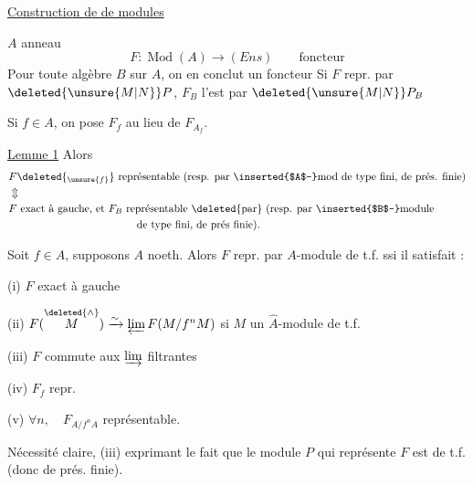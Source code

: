 \margin{$\big/\!\big/$}\uline{Construction de  de modules}

$A$ anneau 
\[
F:\operatorname{Mod}(A)\longrightarrow(\mathit{Ens})\qquad\text{foncteur}
\]
Pour toute algèbre $B$ sur $A$, on en conclut un foncteur
Si $F$ repr. par $\deleted{\unsure{M|N}}P$, $F_B$ l'est par $\deleted{\unsure{M|N}}P_B$

Si $f\in A$, on pose $F_f$ au lieu de $F_{A_f}$.

\uline{Lemme 1}   Alors
\[
\begin{aligned}
&F\deleted{{}_{\unsure{f}}}\ \text{représentable (resp. par \inserted{$A$-}mod de type fini, de prés. finie)}\\
&\Updownarrow\\
&F\ \text{exact à gauche, et } F_B\ \text{représentable \deleted{par} (resp. par \inserted{$B$-}module}\\
&\hspace{12em}\text{de type fini, de prés finie).}
\end{aligned}
\]

  Soit $f\in A$, supposons $A$ noeth. Alors $F$ repr.  par  $A$-module de t.f. ssi il satisfait :

(i) $F$ exact à gauche

(ii) $F(\overset{\deleted{\wedge}}{M})\xrightarrow{\sim}\varprojlim F(M/f^nM)$ \quad si $M$ un $\widehat A$-module  de t.f. 

(iii) $F$ commute aux $\varinjlim$ filtrantes

(iv) $F_f$ repr. 

(v) $\forall n,\quad F_{A/f^nA}$ représentable.

Nécessité claire, (iii) exprimant le fait que le module $P$ qui représente $F$ est de t.f. (donc de prés. finie).

